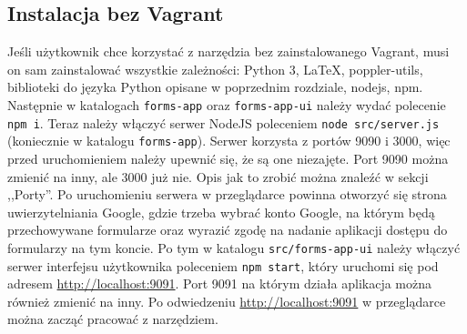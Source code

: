 \subsection{Instalacja bez Vagrant}
Jeśli użytkownik chce korzystać z narzędzia bez zainstalowanego Vagrant, musi on
sam zainstalować wszystkie zależności: Python 3, \LaTeX{}, poppler-utils, biblioteki
do języka Python opisane w poprzednim rozdziale, nodejs, npm. Następnie w katalogach
\texttt{forms-app} oraz \texttt{forms-app-ui} należy wydać polecenie \texttt{npm i}.
Teraz należy włączyć serwer NodeJS poleceniem \texttt{node src/server.js} 
(koniecznie w katalogu \texttt{forms-app}). Serwer korzysta z portów 9090 i 3000, 
więc przed uruchomieniem należy upewnić się, że są one niezajęte. Port 9090 można
zmienić na inny, ale 3000 już nie. Opis jak to zrobić można znaleźć w sekcji ,,Porty''.
Po uruchomieniu serwera w przeglądarce powinna otworzyć się
strona uwierzytelniania Google, gdzie trzeba wybrać konto Google, na którym
będą przechowywane formularze oraz wyrazić zgodę na nadanie aplikacji dostępu do
formularzy na tym koncie. Po tym w katalogu \texttt{src/forms-app-ui}
należy włączyć serwer interfejsu użytkownika poleceniem \texttt{npm start}, który
uruchomi się pod adresem \href{http://localhost:9091}{http://localhost:9091}.
Port 9091 na którym działa aplikacja można również zmienić na inny.
Po odwiedzeniu \href{http://localhost:9091}{http://localhost:9091} w przeglądarce
można zacząć pracować z narzędziem.

